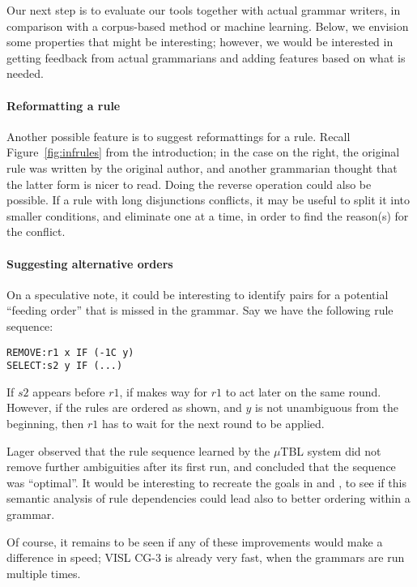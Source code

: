 {{Our next step is to evaluate our tools together with actual grammar writers,
in comparison with a corpus-based method or machine learning. 
Below, we envision some properties that might be interesting; however, we would be interested in getting feedback from actual grammarians and adding features based on what is needed.

\paragraph{Reformatting a rule}

Another possible feature is to suggest reformattings for a rule. Recall
Figure~\ref{fig:infrules} from the introduction; in the case on the right, the
original rule was written by the original author, and another
grammarian thought that the latter form is nicer to read. Doing the
reverse operation could also be possible. If a rule with long
disjunctions conflicts, it may be useful to split it into smaller
conditions, and eliminate one at a time, in order to find the
reason(s) for the conflict.


\paragraph{Suggesting alternative orders} 
On a speculative note, it could be interesting to identify pairs for a potential ``feeding order'' that is missed in the grammar. Say we have the following rule sequence:

\begin{verbatim}
REMOVE:r1 x IF (-1C y)
SELECT:s2 y IF (...)
\end{verbatim}

If $s2$ appears before $r1$, if makes way for $r1$ to act later on the same round. 
However, if the rules are ordered as shown, and $y$ is not unambiguous from the beginning, then $r1$ has to wait for the next round to be applied.



Lager \cite{lager01transformation} observed that the rule sequence learned by the $\mu$TBL system did not remove further ambiguities after its first run, and concluded that the sequence was ``optimal''. 
It would be interesting to recreate the goals in \cite{lager01transformation} and \cite{bick2013tuning}, to see if this semantic analysis of rule dependencies could lead also to better ordering within a grammar.

Of course, it remains to be seen if any of these improvements would make a difference in speed; VISL CG-3 is already very fast, when the grammars are run multiple times.

}}
